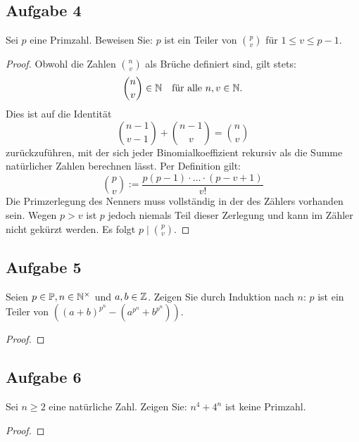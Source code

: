 \subsection{Aufgabe 4}
Sei $p$ eine Primzahl. Beweisen Sie: $p$ ist ein Teiler von $\binom{p}{v}$
für $1 \leq v \leq p - 1$.
\begin{proof}
  Obwohl die Zahlen $\binom{n}{v}$ als Brüche definiert sind, gilt stets:
  \begin{equation*}
    \binom{n}{v} \in \mathbb{N}{} \quad \text{für alle } n,v \in \mathbb{N}{}.
  \end{equation*}
  Dies ist auf die Identität
  \begin{equation*}
    \binom{n - 1}{v - 1} + \binom{n - 1}{v} = \binom{n}{v}
  \end{equation*}
  zurückzuführen, mit der sich jeder Binomialkoeffizient rekursiv als
  die Summe natürlicher Zahlen berechnen lässt.
  Per Definition gilt:
  \begin{equation*}
    \binom{p}{v} := \frac{p(p-1) \cdot \ldots \cdot (p - v + 1)}{v!}
  \end{equation*}
  Die Primzerlegung des Nenners muss vollständig in der des Zählers vorhanden
  sein. Wegen $p > v$ ist $p$ jedoch niemals Teil dieser Zerlegung und
  kann im Zähler nicht gekürzt werden.
  Es folgt $p \mid \binom{p}{v}$.
\end{proof}

\newpage
\subsection{Aufgabe 5}
Seien $p \in \mathbb{P}{}, n \in \mathbb{N}^\times{}$ und $a,b \in \mathbb{Z}{}$. Zeigen Sie durch Induktion
nach $n$: $p$ ist ein Teiler von
$((a + b)^{p^n} - (a^{p^n} + b^{p^n}))$.
\begin{proof}
\end{proof}

\newpage
\subsection{Aufgabe 6}
Sei $n \geq 2$ eine natürliche Zahl. Zeigen Sie: $n^4 + 4^n$ ist keine Primzahl.
\begin{proof}
\end{proof}